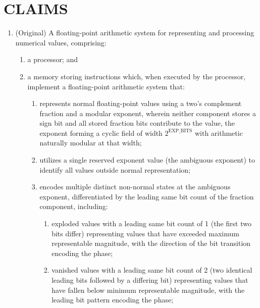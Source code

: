 \documentclass[12pt,letter]{article}
\begin{document}
\newpage

\newcommand{\claim}[2]{
    \stepcounter{claimcounter}
    \textbf{Claim \arabic{claimcounter}.} #2\par
    \vspace{0.5em}
}

\section{CLAIMS}

\begin{enumerate}
    \item\label{cl:scalar-system} (Original) A floating-point arithmetic system for representing and processing numerical values, comprising:
    \begin{enumerate}
        \item a processor; and
        \item a memory storing instructions which, when executed by the processor, implement a floating-point arithmetic system that:
              \begin{enumerate}
                  \item represents normal floating-point values using a two's complement fraction and a modular exponent, wherein neither component stores a sign bit and all stored fraction bits contribute to the value, the exponent forming a cyclic field of width $2^{\text{EXP\_BITS}}$ with arithmetic naturally modular at that width;
                  \item utilizes a single reserved exponent value (the ambiguous exponent) to identify all values outside normal representation;
                  \item encodes multiple distinct non-normal states at the ambiguous exponent, differentiated by the leading same bit count of the fraction component, including:
                        \begin{enumerate}
                            \item exploded values with a leading same bit count of 1 (the first two bits differ) representing values that have exceeded maximum representable magnitude, with the direction of the bit transition encoding the phase;
                            \item vanished values with a leading same bit count of 2 (two identical leading bits followed by a differing bit) representing values that have fallen below minimum representable magnitude, with the leading bit pattern encoding the phase;

\end{enumerate}
\end{enumerate}
\end{enumerate}
\end{enumerate}
\end{document}

